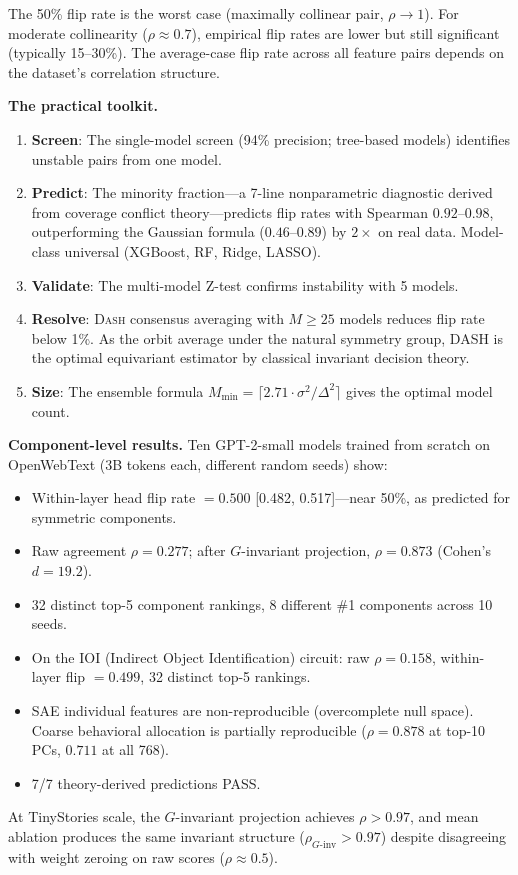 \documentclass{article}
\newcommand{\DASH}{\textsc{Dash}}
\begin{document}
The 50\% flip rate is the worst case (maximally collinear pair, $\rho \to 1$). For moderate collinearity ($\rho \approx 0.7$), empirical flip rates are lower but still significant (typically 15--30\%). The average-case flip rate across all feature pairs depends on the dataset's correlation structure.

\noindent\textbf{The practical toolkit.}
\begin{enumerate}
    \item \textbf{Screen}: The single-model screen (94\% precision; tree-based models) identifies unstable pairs from one model.
    \item \textbf{Predict}: The minority fraction---a 7-line nonparametric diagnostic derived from coverage conflict theory---predicts flip rates with Spearman $0.92$--$0.98$, outperforming the Gaussian formula ($0.46$--$0.89$) by $2\times$ on real data. Model-class universal (XGBoost, RF, Ridge, LASSO).
    \item \textbf{Validate}: The multi-model Z-test confirms instability with 5 models.
    \item \textbf{Resolve}: \DASH{} consensus averaging with $M \geq 25$ models reduces flip rate below 1\%. As the orbit average under the natural symmetry group, DASH is the optimal equivariant estimator by classical invariant decision theory.
    \item \textbf{Size}: The ensemble formula $M_{\min} = \lceil 2.71 \cdot \sigma^2/\Delta^2 \rceil$ gives the optimal model count.
\end{enumerate}

\noindent\textbf{Component-level results.}
Ten GPT-2-small models trained from scratch on OpenWebText (3B tokens each, different random seeds) show:
\begin{itemize}
    \item Within-layer head flip rate $= 0.500$ [0.482, 0.517]---near 50\%, as predicted for symmetric components.
    \item Raw agreement $\rho = 0.277$; after $G$-invariant projection, $\rho = 0.873$ (Cohen's $d = 19.2$).
    \item 32 distinct top-5 component rankings, 8 different \#1 components across 10 seeds.
    \item On the IOI (Indirect Object Identification) circuit: raw $\rho = 0.158$, within-layer flip $= 0.499$, 32 distinct top-5 rankings.
    \item SAE individual features are non-reproducible (overcomplete null space). Coarse behavioral allocation is partially reproducible ($\rho = 0.878$ at top-10 PCs, $0.711$ at all 768).
    \item 7/7 theory-derived predictions PASS.
\end{itemize}
At TinyStories scale, the $G$-invariant projection achieves $\rho > 0.97$, and mean ablation produces the same invariant structure ($\rho_{G\text{-inv}} > 0.97$) despite disagreeing with weight zeroing on raw scores ($\rho \approx 0.5$).
\end{document}
